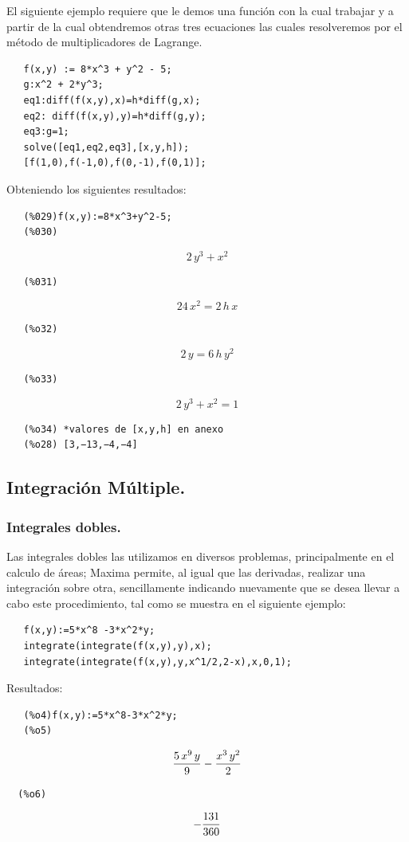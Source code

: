 \documentclass[12pt]{article}
\begin{document}
   El siguiente ejemplo requiere que le demos una función con la cual trabajar y a partir de la cual obtendremos otras tres ecuaciones las cuales resolveremos por el método de multiplicadores de Lagrange.
   
   \begin{verbatim}
   f(x,y) := 8*x^3 + y^2 - 5;
   g:x^2 + 2*y^3;
   eq1:diff(f(x,y),x)=h*diff(g,x);
   eq2: diff(f(x,y),y)=h*diff(g,y);
   eq3:g=1;
   solve([eq1,eq2,eq3],[x,y,h]);
   [f(1,0),f(-1,0),f(0,-1),f(0,1)];
   \end{verbatim}
   
   Obteniendo los siguientes resultados:
   
   \begin{verbatim}
   (%029)f(x,y):=8*x^3+y^2-5;
   (%030)
   \end{verbatim}
   $$2\,y^3+x^2$$
   \begin{verbatim}
   (%031)
   \end{verbatim}
   $$24\,x^2=2\,h\,x$$
   \begin{verbatim}
   (%o32)
   \end{verbatim}
   $$2\,y=6\,h\,y^2$$
   \begin{verbatim}
   (%o33)
   \end{verbatim}
   $$2\,y^3+x^2=1$$
   \begin{verbatim}
   (%o34) *valores de [x,y,h] en anexo
   (%o28) [3,−13,−4,−4]
   \end{verbatim}
   
   \subsection*{Integración Múltiple.}
   \subsubsection*{Integrales dobles.}
   
   Las integrales dobles las utilizamos en diversos problemas, principalmente en el calculo de áreas; Maxima permite, al igual que  las derivadas, realizar una integración sobre otra, sencillamente indicando nuevamente que se desea llevar a cabo este procedimiento, tal como se muestra en el siguiente ejemplo:
   \begin{verbatim}
   f(x,y):=5*x^8 -3*x^2*y;
   integrate(integrate(f(x,y),y),x);
   integrate(integrate(f(x,y),y,x^1/2,2-x),x,0,1);
   \end{verbatim}
   Resultados:
   \begin{verbatim}
   (%o4)f(x,y):=5*x^8-3*x^2*y;
   (%o5)
   \end{verbatim}
   $${{5\,x^9\,y}\over{9}}-{{x^3\,y^2}\over{2}}$$
  \begin{verbatim}
  (%o6)
  \end{verbatim}
  $$-{{131}\over{360}}$$
  
\end{document}
